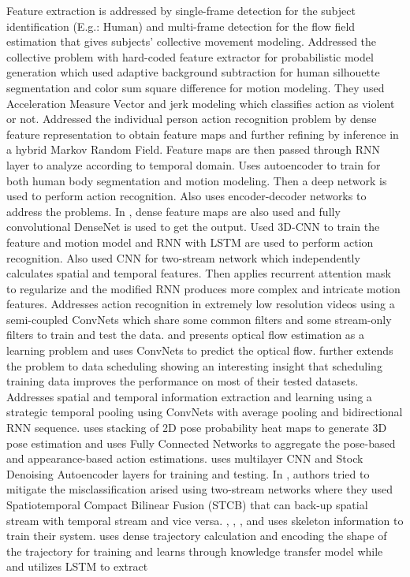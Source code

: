 \documentclass[11pt,english]{article}
\begin{document}
Feature extraction is addressed by single-frame detection for the subject identification (E.g.: Human) and multi-frame detection for the flow field estimation that gives subjects’ collective movement modeling. \citep{datta2002person} Addressed the collective problem with hard-coded feature extractor for probabilistic model generation which used adaptive background subtraction for human silhouette segmentation and color sum square difference for motion modeling. They used Acceleration Measure Vector and jerk modeling which classifies action as violent or not. \citep{bagautdinov2017social} Addressed the individual person action recognition problem by dense feature representation to obtain feature maps and further refining by inference in a hybrid Markov Random Field. Feature maps are then passed through RNN layer to analyze according to temporal domain. \citep{xiao2017human} Uses autoencoder to train for both human body segmentation and motion modeling. Then a deep network is used to perform action recognition. \citep{zhu2018ev} Also uses encoder-decoder networks to address the problems. In \citep{jegou2017one}, dense feature maps are also used and fully convolutional DenseNet is used to get the output. \citep{baccouche2011sequential} Used 3D-CNN to train the feature and motion model and RNN with LSTM are used to perform action recognition. \citep{sun2017lattice} Also used CNN for two-stream network which independently calculates spatial and temporal features. Then applies recurrent attention mask to regularize and the modified RNN produces more complex and intricate motion features. \citep{chen2017semi} Addresses action recognition in extremely low resolution videos using a semi-coupled ConvNets which share some common filters and some stream-only filters to train and test the data. \citep{dosovitskiy2015flownet} and \citep{ilg2017flownet} presents optical flow estimation as a learning problem and uses ConvNets to predict the optical flow. \citep{ilg2017flownet} further extends the problem to data scheduling showing an interesting insight that scheduling training data improves the performance on most of their tested datasets.  \citep{pigou2018beyond} Addresses spatial and temporal information extraction and learning using a strategic temporal pooling using ConvNets with average pooling and bidirectional RNN sequence. \citep{luvizon20182d} uses stacking of 2D pose probability heat maps to generate 3D pose estimation and uses Fully Connected Networks to aggregate the pose-based and appearance-based action estimations. \citep{oyedotun2017deep} uses multilayer CNN and Stock Denoising Autoencoder layers for training and testing. In \citep{wang2017spatiotemporal}, authors tried to mitigate the misclassification arised using two-stream networks where they used Spatiotemporal Compact Bilinear Fusion (STCB) that can back-up spatial stream with temporal stream and vice versa. \citep{rahmani2018learning}, \citep{zhang2017view}, \citep{zhang2017geometric}, \citep{li2017end} and \citep{li2018action} uses skeleton information to train their system. \citep{rahmani2018learning} uses dense trajectory calculation and encoding the shape of the trajectory for training and learns through knowledge transfer model while \citep{zhang2017view} and \citep{zhang2017geometric} utilizes LSTM to extract 
\end{document}
